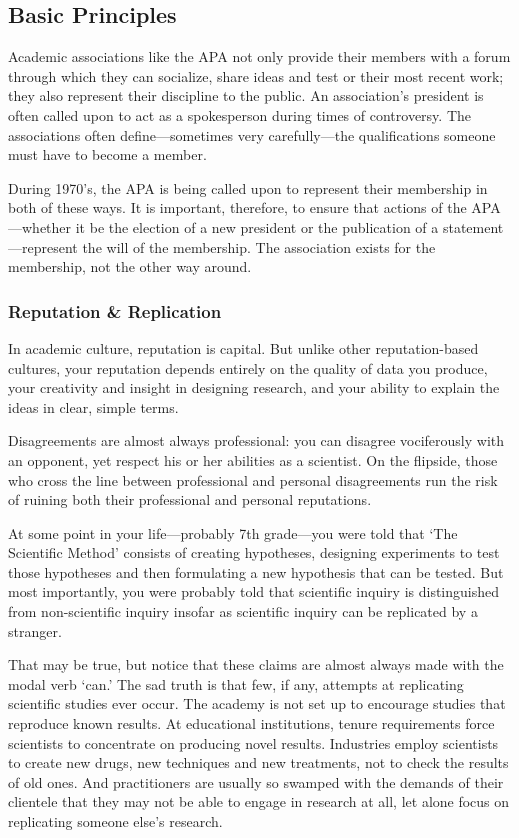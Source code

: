\subsection{Basic Principles}
\label{basicprinciples}

Academic associations like the APA not only provide their members with a forum through which they can socialize, share ideas and test or their most recent work; they also represent their discipline to the public. An association's president is often called upon to act as a spokesperson during times of controversy. The associations often define---sometimes very carefully---the qualifications someone must have to become a member.

During 1970's, the APA is being called upon to represent their membership in both of these ways. It is important, therefore, to ensure that actions of the APA---whether it be the election of a new president or the publication of a statement---represent the will of the membership. The association exists for the membership, not the other way around.

\subsubsection{Reputation \& Replication}
\label{reputationreplication}

In academic culture, reputation is capital. But unlike other reputation-based cultures, your reputation depends entirely on the quality of data you produce, your creativity and insight in designing research, and your ability to explain the ideas in clear, simple terms. 

Disagreements are almost always professional: you can disagree vociferously with an opponent, yet respect his or her abilities as a scientist. On the flipside, those who cross the line between professional and personal disagreements run the risk of ruining both their professional and personal reputations.

At some point in your life---probably 7th grade---you were told that `The Scientific Method' consists of creating hypotheses, designing experiments to test those hypotheses and then formulating a new hypothesis that can be tested. But most importantly, you were probably told that scientific inquiry is distinguished from non-scientific inquiry insofar as scientific inquiry can be replicated by a stranger. 

That may be true, but notice that these claims are almost always made with the modal verb `can.' The sad truth is that few, if any, attempts at replicating scientific studies ever occur. The academy is not set up to encourage studies that reproduce known results. At educational institutions, tenure requirements force scientists to concentrate on producing novel results. Industries employ scientists to create new drugs, new techniques and new treatments, not to check the results of old ones. And practitioners are usually so swamped with the demands of their clientele that they may not be able to engage in research at all, let alone focus on replicating someone else's research.

